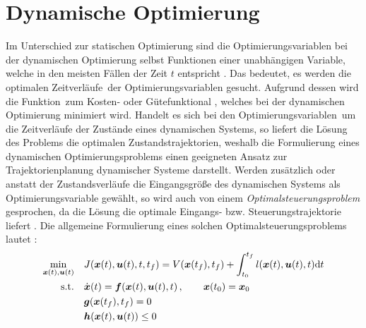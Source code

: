 \section{Dynamische Optimierung}\label{sec:dynamischeOpt}
Im Unterschied zur statischen Optimierung sind die Optimierungsvariablen bei der dynamischen Optimierung selbst Funktionen einer unabhängigen Variable, welche in den meisten Fällen der Zeit $t$ entspricht \cite{KnutGraichen.2012}. Das bedeutet, es werden die optimalen Zeitverläufe \xoft\,der Optimierungsvariablen gesucht. Aufgrund dessen wird die Funktion \fofx\,zum Kosten- oder Gütefunktional \J, welches bei der dynamischen Optimierung minimiert wird. Handelt es sich bei den Optimierungsvariablen \xoft\,um die Zeitverläufe der Zustände eines dynamischen Systems, so liefert die Lösung des Problems die optimalen Zustandstrajektorien, weshalb die Formulierung eines dynamischen Optimierungsproblems einen geeigneten Ansatz zur Trajektorienplanung dynamischer Systeme darstellt. Werden zusätzlich oder anstatt der Zustandsverläufe die Eingangsgröße des dynamischen Systems als Optimierungsvariable gewählt, so wird auch von einem \textit{Optimalsteuerungsproblem} gesprochen, da die Lösung die optimale Eingangs- bzw. Steuerungstrajektorie liefert \cite{KnutGraichen.2012}.
Die allgemeine Formulierung eines solchen Optimalsteuerungsproblems lautet \cite{KnutGraichen.2012}:
\begin{align}
\min_{\boldsymbol{x}(t),\boldsymbol{u}(t)} \quad &J(\boldsymbol{x}(t),\boldsymbol{u}(t),t,t_f) = V(\boldsymbol{x}(t_f),t_f) + \int_{t_0}^{t_f}l(\boldsymbol{x}(t),\boldsymbol{u}(t),t)\textrm{d}{t} \label{eq:J_dyn}\\
\textrm{s.t.} \quad& \dot{\boldsymbol{x}}(t) = \boldsymbol{f}(\boldsymbol{x}(t),\boldsymbol{u}(t),t)\,,\qquad \boldsymbol{x}(t_0) = \boldsymbol{x}_0 \label{eq:system_anfang}\\
&\boldsymbol{g}(\boldsymbol{x}(t_f),t_f) = 0 \label{eq:GNB}\\
&\boldsymbol{h}(\boldsymbol{x}(t),\boldsymbol{u}(t)) \leq 0 \label{eq:UNB}
\end{align}

